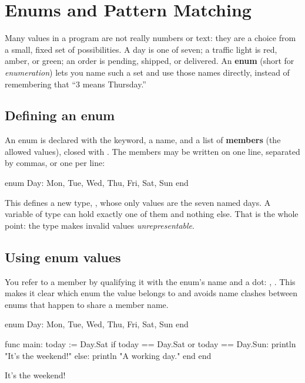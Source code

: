 \chapter{Enums and Pattern Matching}%
\label{ch:enums-matching}

Many values in a program are not really numbers or text: they are a choice from
a small, fixed set of possibilities. A day is one of seven; a traffic light is
red, amber, or green; an order is pending, shipped, or delivered. An
\textbf{enum} (short for \emph{enumeration}) lets you name such a set and use those
names directly, instead of remembering that ``3 means Thursday.''

\section{Defining an enum}

An enum is declared with the  keyword, a name, and a list of
\textbf{members} (the allowed values), closed with . The members may
be written on one line, separated by commas, or one per line:

\begin{salamen}
enum Day: Mon, Tue, Wed, Thu, Fri, Sat, Sun end
\end{salamen}

This defines a new type, , whose only values are the seven named days.
A variable of type  can hold exactly one of them and nothing else. That
is the whole point: the type makes invalid values \emph{unrepresentable}.

\section{Using enum values}

You refer to a member by qualifying it with the enum's name and a dot:
, . This makes it clear which enum the value belongs
to and avoids name clashes between enums that happen to share a member name.

\begin{salamen}
enum Day: Mon, Tue, Wed, Thu, Fri, Sat, Sun end

func main:
    today := Day.Sat
    if today == Day.Sat or today == Day.Sun:
        println "It's the weekend!"
    else:
        println "A working day."
    end
end
\end{salamen}

\begin{progout}
It's the weekend!
\end{progout}

